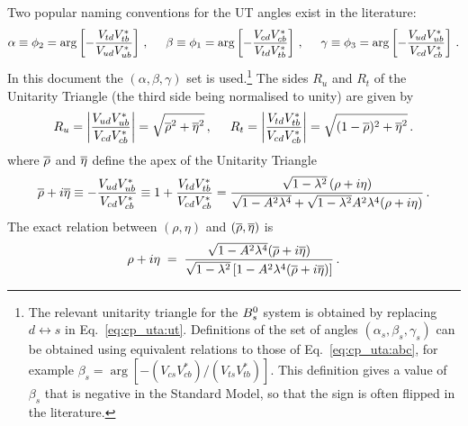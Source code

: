 Two popular naming conventions for the UT angles exist in the literature:
\begin{equation}
  \label{eq:cp_uta:abc}
  \alpha  \equiv  \phi_2  = 
  \arg\left[ - \frac{V_{td}V_{tb}^*}{V_{ud}V_{ub}^*} \right]\,,
  \hspace{0.5cm}
  \beta   \equiv   \phi_1 =  
  \arg\left[ - \frac{V_{cd}V_{cb}^*}{V_{td}V_{tb}^*} \right]\,,
  \hspace{0.5cm}
  \gamma  \equiv   \phi_3  =  
  \arg\left[ - \frac{V_{ud}V_{ub}^*}{V_{cd}V_{cb}^*} \right]\,.
\end{equation}
In this document the $\left( \alpha, \beta, \gamma \right)$ set is used.\footnote{
  The relevant unitarity triangle for the $B^0_s$ system is obtained 
  by replacing $d \leftrightarrow s$ in Eq.~\ref{eq:cp_uta:ut}.
  Definitions of the set of angles $( \alpha_s, \beta_s, \gamma_s )$ 
  can be obtained using equivalent relations to those of Eq.~\ref{eq:cp_uta:abc},
  for example $\beta_s = \arg\left[ - (V_{cs}V_{cb}^*) / (V_{ts}V_{tb}^*) \right]$.
  This definition gives a value of $\beta_s$ that is negative in the Standard Model,
  so that the sign is often flipped in the literature.
}
The sides $R_u$ and $R_t$ of the Unitarity Triangle 
(the third side being normalised to unity) 
are given by
\begin{equation}
  \label{eq:ru_rt}
  R_u =
  \left|\frac{V_{ud}V_{ub}^*}{V_{cd}V_{cb}^*} \right|
  = \sqrt{\overline{\rho}^2+\overline{\eta}^2} \,,
  \hspace{0.5cm}
  R_t = 
  \left|\frac{V_{td}V_{tb}^*}{V_{cd}V_{cb}^*}\right| 
  = \sqrt{(1-\overline{\rho})^2+\overline{\eta}^2} \,.
\end{equation} 
where $\overline{\rho}$ and $\overline{\eta}$ define 
the apex of the Unitarity Triangle~\cite{Buras:1994ec} 
\begin{equation}
  \label{eq:rhoetabar}
  \overline{\rho} + i\overline{\eta}
  \equiv -\frac{V_{ud}V_{ub}^*}{V_{cd}V_{cb}^*}
  \equiv 1 + \frac{V_{td}V_{tb}^*}{V_{cd}V_{cb}^*}
  = \frac{\sqrt{1-\lambda^2}\,(\rho + i \eta)}{\sqrt{1-A^2\lambda^4}+\sqrt{1-\lambda^2}A^2\lambda^4(\rho+i\eta)} \, .
\end{equation}
The exact relation between $\left( \rho, \eta \right)$ and 
$\left( \overline{\rho}, \overline{\eta} \right)$ is
\begin{equation}
  \label{eq:rhoetabarinv}
  \rho + i\eta \;=\; 
  \frac{ 
    \sqrt{ 1-A^2\lambda^4 }(\overline{\rho}+i\overline{\eta}) 
  }{
    \sqrt{ 1-\lambda^2 } \left[ 1-A^2\lambda^4(\overline{\rho}+i\overline{\eta}) \right]
  } \, .
\end{equation}

